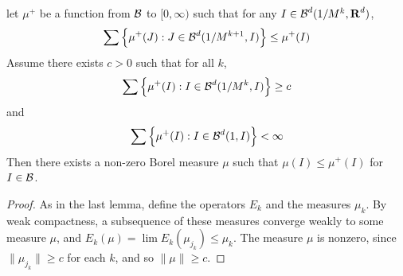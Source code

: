 \begin{lemma}
	let $\mu^+$ be a function from $\operatorname{\mathcal{B}}$ to $[0,\infty)$ such that for any $I \in \operatorname{\mathcal{B}}^d(1/M^k,\operatorname{\mathbf{R}}^d)$,
	\[ \sum \left\{ \mu^+(J) :J \in \operatorname{\mathcal{B}}^d(1/M^{k+1},I) \right\} \leq \mu^+(I) \]
	Assume there exists $c > 0$ such that for all $k$,
	\[ \sum \left\{ \mu^+(I) : I \in \operatorname{\mathcal{B}}^d(1/M^k,I) \right\} \geq c \]
	and
	\[ \sum \left\{ \mu^+(I) : I \in \operatorname{\mathcal{B}}^d(1,I) \right\} < \infty \]	
	Then there exists a non-zero Borel measure $\mu$ such that $\mu(I) \leq \mu^+(I)$ for $I \in \operatorname{\mathcal{B}}$.
\end{lemma}
\begin{proof}
	As in the last lemma, define the operators $E_k$ and the measures $\mu_k$. By weak compactness, a subsequence of these measures converge weakly to some measure $\mu$, and $E_k(\mu) = \lim E_k(\mu_{j_k}) \leq \mu_k$. The measure $\mu$ is nonzero, since $\| \mu_{j_k} \| \geq c$ for each $k$, and so $\| \mu \| \geq c$.
\end{proof}

